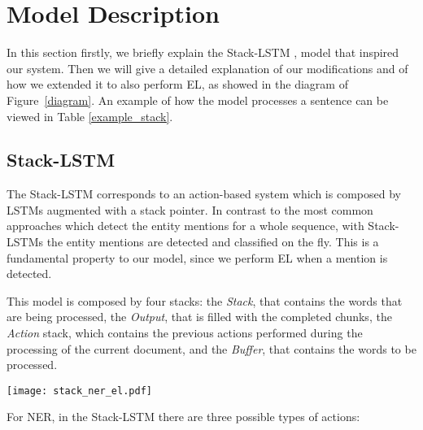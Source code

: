 \documentclass[11pt,a4paper,dvipsnames]{article}
\begin{document}
\section{Model Description}
In this section firstly, we briefly explain the Stack-LSTM \citep{Dyer_stack_2015, lample2016neural}, model that inspired our system. Then we will give a detailed explanation of our modifications and of how we extended it to also perform EL, as showed in the diagram of Figure~\ref{diagram}. An example of how the model processes a sentence can be viewed in Table \ref{example_stack}.

\subsection{Stack-LSTM}
The Stack-LSTM corresponds to an action-based system which is composed by LSTMs augmented with a stack pointer.
In contrast to the most common approaches which detect the entity mentions for a whole sequence, with Stack-LSTMs the entity mentions are detected and classified on the fly. This is a fundamental property to our model, since we perform EL when a mention is detected.

This model is composed by four stacks: the \textit{Stack}, that contains the words that are being processed, the \textit{Output}, that is filled with the completed chunks, the \textit{Action} stack, which contains the previous actions performed during the processing of the current document, and the \textit{Buffer}, that contains the words to be processed. 
\begin{figure*}[ht!]
\begin{center}
\texttt{[image: stack\_ner\_el.pdf]}
\end{center}
\caption{Simplified diagram of our model. The dashed arrows only occur when the action is \textit{Reduce}. The blocks in blue correspond to our extensions to the Stack-LSTM and the green blocks correspond to the model's predictions. The grey blocks correspond to the stack-LSTM, the blue blocks to our extensions, and the green ones to the outputs.}
\label{diagram}
\end{figure*}

For NER, in the Stack-LSTM there are three possible types of actions: 
\end{document}
